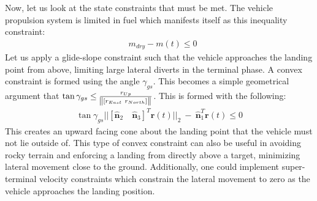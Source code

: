 \documentclass[conf]{new-aiaa}
\begin{document}
Now, let us look at the state constraints that must be met. The vehicle propulsion system is limited in fuel which manifests itself as this inequality constraint:
\begin{align}
& m_{dry} - m(t) \leq 0
\end{align}
%
Let us apply a glide-slope constraint such that the vehicle approaches the landing point from above, limiting large lateral diverts in the terminal phase. A convex constraint  is formed using the angle $\gamma_{gs}$. This becomes a simple geometrical argument that $\tan{\gamma_{gs}} \leq \frac{r_{Up}}{\norm{[ r_{East} \ r_{North}]}}$. This is formed with the following:
\begin{align}
\tan{\gamma_{gs}} || [\hat{\bm{n}}_2 \quad \hat{\bm{n}}_3 ]^T \mathbf{r}(t) \lvert\lvert_2 \ - \ \hat{\bm{n}}_1^T \mathbf{r}(t) \leq 0
\end{align}
This  creates an upward facing cone about the landing point that the vehicle must not lie outside of. This type of convex constraint can also be useful in avoiding rocky terrain and enforcing a landing from directly above a target, minimizing lateral movement close to the ground. Additionally, one could implement super-terminal velocity constraints which constrain the lateral movement to zero as the vehicle approaches the landing position.
\end{document}
